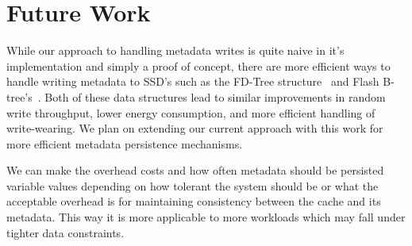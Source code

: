 \section{Future Work}
\label{sec:future}

While our approach to handling metadata writes is quite naive in it's
implementation and simply a proof of concept, there are more efficient
ways to handle writing metadata to SSD's such as the FD-Tree
structure~\cite{FD-Tree} and Flash B-tree's~\cite{FlashB-Tree}. Both
of these data structures lead to similar improvements in random write
throughput, lower energy consumption, and more efficient handling of
write-wearing. We plan on extending our current approach with this
work for more efficient metadata persistence mechanisms.

We can make the overhead costs and how often metadata should be
persisted variable values depending on how tolerant the system should
be or what the acceptable overhead is for maintaining consistency
between the cache and its metadata. This way it is more applicable to
more workloads which may fall under tighter data constraints.
